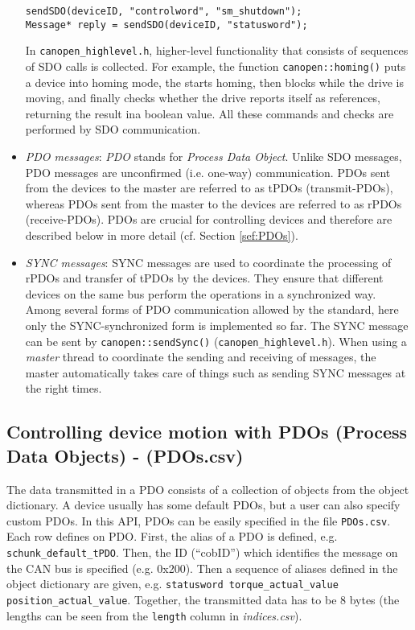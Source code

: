 \begin{itemize}
\begin{verbatim}
sendSDO(deviceID, "controlword", "sm_shutdown");
Message* reply = sendSDO(deviceID, "statusword");
\end{verbatim}
In \texttt{canopen\_highlevel.h}, higher-level functionality that consists of sequences of SDO calls is collected. For example, the function \texttt{canopen::homing()} puts a device into homing mode, the starts homing, then blocks while the drive is moving, and finally checks whether the drive reports itself as references, returning the result ina boolean value. All these commands and checks are performed by SDO communication.
\item {\em PDO messages}: {\em PDO} stands for {\em Process Data Object}. Unlike SDO messages, PDO messages are unconfirmed (i.e. one-way) communication. PDOs sent from the devices to the master are referred to as tPDOs (transmit-PDOs), whereas PDOs sent from the master to the devices are referred to as rPDOs (receive-PDOs). PDOs are crucial for controlling devices and therefore are described below in more detail (cf. Section \ref{sef:PDOs}).
\item {\em SYNC messages}: SYNC messages are used to coordinate the processing of rPDOs and transfer of tPDOs by the devices. They ensure that different devices on the same bus perform the operations in a synchronized way. Among several forms of PDO communication allowed by the standard, here only the SYNC-synchronized form is implemented so far. The SYNC message can be sent by \texttt{canopen::sendSync()} (\texttt{canopen\_highlevel.h}). When using a {\em master} thread to coordinate the sending and receiving of messages, the master automatically takes care of things such as sending SYNC messages at the right times.
\end{itemize}

\subsection{Controlling device motion with PDOs (Process Data Objects) - (PDOs.csv)}

The data transmitted in a PDO consists of a collection of objects from the object dictionary. A device usually has some default PDOs, but a user can also specify custom PDOs.
In this API, PDOs can be easily specified in the file \texttt{PDOs.csv}. Each row defines on PDO. First, the alias of a PDO is defined, e.g. \texttt{schunk\_default\_tPDO}. Then, the ID (``cobID'') which identifies the message on the CAN bus is specified (e.g. 0x200). Then a sequence of aliases defined in the object dictionary are given, e.g. \texttt{statusword torque\_actual\_value position\_actual\_value}. Together, the transmitted data has to be 8 bytes (the lengths can be seen from the \texttt{length} column in {\em indices.csv}). 


